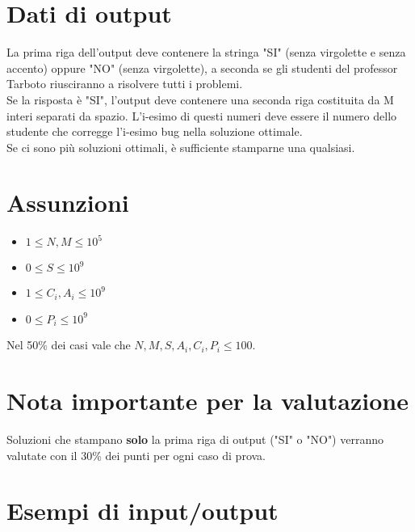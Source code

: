 \documentclass[a4paper,11pt]{article}
\begin{document}
\section*{Dati di output}
  
La prima riga dell'output deve contenere la stringa "SI" (senza virgolette e senza accento) oppure "NO" (senza virgolette), a seconda se gli studenti del professor Tarboto riusciranno a risolvere tutti i problemi. \\
Se la risposta è "SI", l'output deve contenere una seconda riga costituita da M interi separati da spazio. L'i-esimo di questi numeri deve essere il numero dello studente che corregge l'i-esimo bug nella soluzione ottimale. \\
Se ci sono più soluzioni ottimali, è sufficiente stamparne una qualsiasi.
  \section*{Assunzioni}
\begin{itemize}
\item 
$1 \leq N, M \leq 10^5$
\item
$0 \leq S \leq 10^9$
\item
$1 \leq C_i, A_i \leq 10^9$
\item
$0 \leq P_i \leq 10^9$
\end{itemize}
 
\noindent Nel 50\% dei casi vale che $N, M, S, A_i, C_i, P_i \leq 100$.

\section*{Nota importante per la valutazione}
Soluzioni che stampano \textbf{solo} la prima riga di output ("SI" o "NO") verranno valutate con il 30\% dei punti per ogni caso di prova.

\section*{Esempi di input/output}
\end{document}
